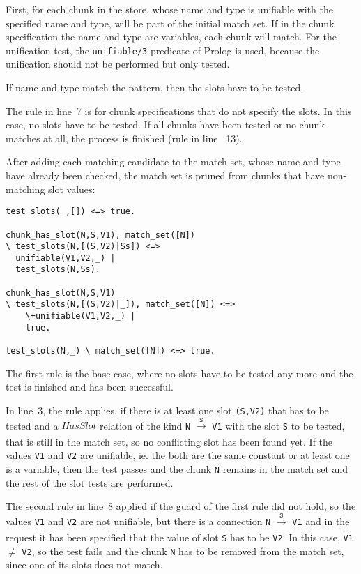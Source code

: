 First, for each chunk in the store, whose name and type is unifiable with the specified name and type, will be part of the initial match set. If in the chunk specification the name and type are variables, each chunk will match. For the unification test, the \verb|unifiable/3| predicate of Prolog is used, because the unification should not be performed but only tested. 

If name and type match the pattern, then the slots have to be tested.

The rule in line~7 is for chunk specifications that do not specify the slots. In this case, no slots have to be tested. If all chunks have been tested or no chunk matches at all, the process is finished (rule in line ~13).

After adding each matching candidate to the match set, whose name and type have already been checked, the match set is pruned from chunks that have non-matching slot values:

\begin{lstlisting}
test_slots(_,[]) <=> true.

chunk_has_slot(N,S,V1), match_set([N]) 
\ test_slots(N,[(S,V2)|Ss]) <=> 
  unifiable(V1,V2,_) | 
  test_slots(N,Ss).

chunk_has_slot(N,S,V1) 
\ test_slots(N,[(S,V2)|_]), match_set([N]) <=> 
    \+unifiable(V1,V2,_) | 
    true.

test_slots(N,_) \ match_set([N]) <=> true.
\end{lstlisting}

The first rule is the base case, where no slots have to be tested any more and the test is finished and has been successful.

In line~3, the rule applies, if there is at least one slot \verb|(S,V2)| that has to be tested and a $HasSlot$ relation of the kind \verb|N| $\xrightarrow[]{\mathtt{S}}$ \verb|V1| with the slot \verb|S| to be tested, that is still in the match set, so no conflicting slot has been found yet. If the values \verb|V1| and \verb|V2| are unifiable, ie. the both are the same constant or at least one is a variable, then the test passes and the chunk \verb|N| remains in the match set and the rest of the slot tests are performed.

The second rule in line~8 applied if the guard of the first rule did not hold, so the values \verb|V1| and \verb|V2| are not unifiable, but there is a connection \verb|N| $\xrightarrow[]{\mathtt{S}}$ \verb|V1| and in the request it has been specified that the value of slot \verb|S| has to be \verb|V2|. In this case, \verb|V1| $\neq$ \verb|V2|, so the test fails and the chunk \verb|N| has to be removed from the match set, since one of its slots does not match.

